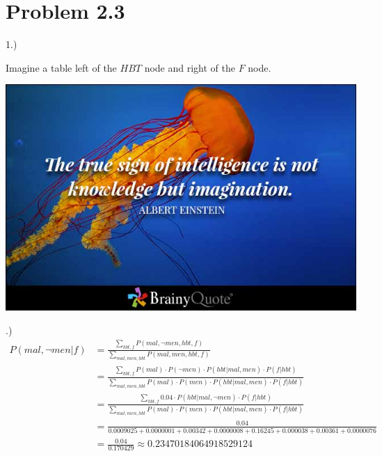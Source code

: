 \documentclass[a4paper]{article}
\begin{document}
\section*{Problem 2.3}
1.)


Imagine a table left of the $HBT$ node and right of the $F$ node.

\includegraphics[scale=0.5]{alberteinstein1.jpg}

\newpage
{}.)
\begin{align*}
    P(mal, \lnot men | f) &= \frac{\sum_{hbt, f} P(mal, \lnot men, hbt, f)}{ \sum_{mal, men, hbt}P(mal, men, hbt, f)} \\
    &= \frac{\sum_{hbt, f} P(mal) \cdot P(\lnot men) \cdot P(hbt|mal, men) \cdot P(f|hbt)}{\sum_{mal, men, hbt}P(mal) \cdot P(men) \cdot P(hbt|mal, men) \cdot P(f|hbt)}\\
    &= \frac{\sum_{hbt, f} 0.04 \cdot P(hbt|mal, \lnot men) \cdot P(f|hbt)}{\sum_{mal, men, hbt} P(mal) \cdot P(men) \cdot P(hbt|mal, men) \cdot P(f|hbt)}\\
    &= \frac{0.04}{0.0009025 + 0.0000001 + 0.00342 + 0.0000008 + 0.16245 + 0.000038 + 0.00361 + 0.0000076}\\
    &= \frac{0.04}{0.170429} \approx 0.23470184064918529124
\end{align*}
\end{document}
